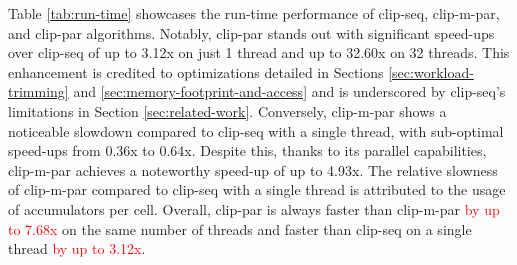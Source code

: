 \documentclass{egpubl}
\newcommand*{\fix}[1]{\textcolor{red}{#1}}
\begin{document}
Table \ref{tab:run-time} showcases the run-time performance of clip-seq, clip-m-par, and clip-par algorithms. Notably, clip-par stands out with significant speed-ups over clip-seq of up to 3.12x on just 1 thread and up to 32.60x on 32 threads. This enhancement is credited to optimizations detailed in Sections \ref{sec:workload-trimming} and \ref{sec:memory-footprint-and-access} and is underscored by clip-seq's limitations in Section \ref{sec:related-work}. Conversely, clip-m-par shows a noticeable slowdown compared to clip-seq with a single thread, with sub-optimal speed-ups from 0.36x to 0.64x. Despite this, thanks to its parallel capabilities, clip-m-par achieves a noteworthy speed-up of up to 4.93x. The relative slowness of clip-m-par compared to clip-seq with a single thread is attributed to the usage of accumulators per cell. Overall, clip-par is always faster than clip-m-par \fix{by up to 7.68x} on the same number of threads and faster than clip-seq on a single thread \fix{by up to 3.12x}.
\end{document}
